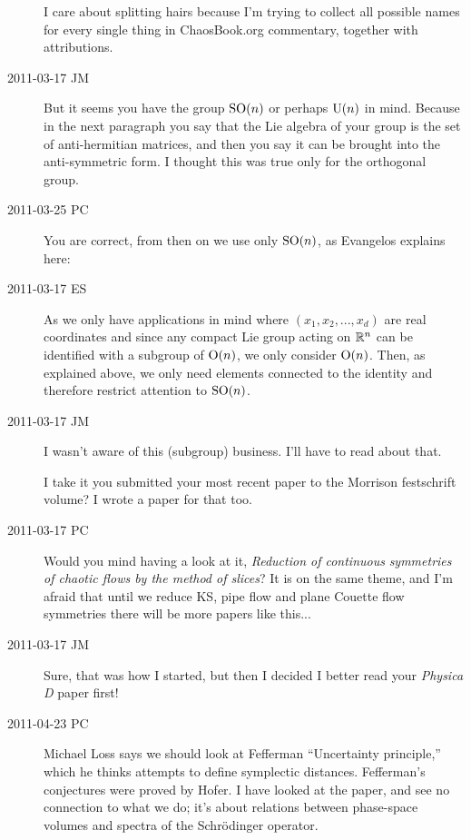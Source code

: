 \begin{description}
I care about splitting hairs because I'm trying to collect all possible
names for every single thing in ChaosBook.org commentary, together with
attributions.

\item[2011-03-17 JM]
But it seems you have the group $\textrm{SO}(n)$ or perhaps
$\textrm{U}(n)$ in mind. Because in the next paragraph
you say that the Lie algebra of your group is the set
of anti-hermitian matrices, and then you say it can be
brought into the anti-symmetric form. I thought this was
true only for the orthogonal group.

\item[2011-03-25 PC]
You are correct, from then on we use only  $\textrm{SO}(n)$, as Evangelos
explains here:

\item[2011-03-17 ES]
As we only have applications in mind where $(x_1,x_2,...,x_d)$ are real
coordinates and since any compact Lie group acting on $\mathbb{R}^n$ can be
identified with a subgroup of $\textrm{O}(n)$, we only consider $\textrm{O}(n)$. Then, as
explained above, we only need elements connected to the identity and
therefore restrict attention to $\textrm{SO}(n)$.

\item[2011-03-17 JM]
I wasn't aware of this (subgroup) business. I'll have to read about that.

I take it you submitted your most recent paper to the Morrison
festschrift volume? I wrote a paper for that too.

\item[2011-03-17 PC]
Would you mind having a look at it,
{\emph{Reduction of continuous}} \emph{symmetries of chaotic flows by the
method of slices}? It is on the same theme, and I'm afraid that until we
reduce KS, pipe flow and plane Couette flow symmetries there will be more
papers like this...

\item[2011-03-17 JM]
Sure, that was how I started, but then I decided I better read
your \emph{Physica D} paper first!

\item[2011-04-23 PC]
Michael Loss says we should look at Fefferman ``Uncertainty
principle,'' which he thinks attempts to define symplectic distances.
Fefferman's conjectures were proved by Hofer. I have looked at the paper,
and see no connection to what we do; it's about relations between
phase-space volumes and spectra of the Schr\"odinger operator.


\end{description}
